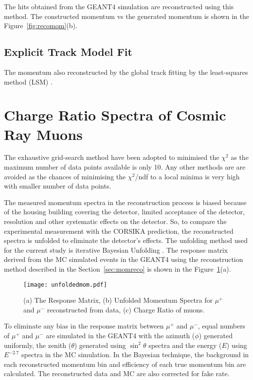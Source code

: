 The hits obtained from the GEANT4 simulation are reconstructed using
this method. The constructed momentum vs the generated momentum is
shown in the Figure~\ref{fig:recomom}(b).

\subsection{Explicit Track Model Fit}
The momentum also reconstructed by the global track fitting by the
least-squares method (LSM) \cite{explicit1}.


\section{Charge Ratio Spectra of Cosmic Ray Muons}
\label{section:multiresult}

The exhaustive grid-search method have been adopted to minimised the
$\chi^{2}$ as the maximum number of data points available is only 10.
Any other methods are are avoided as the chances of minimising the
$\chi^{2}$/ndf to a local minima is very high with smaller number of
data points.


The measured momentum spectra in the reconstruction process is biased
because of the housing building covering the detector, limited
acceptance of the detector, resolution and other systematic effects
on the detector. So, to compare the experimental measurement with the
CORSIKA prediction, the reconstructed spectra is unfolded to eliminate
the detector's effects.
The unfolding method used for the current study is iterative
Bayesian Unfolding \cite{bayesian}.
The response matrix derived from the MC simulated events in the
GEANT4 using the reconstruction method described in the
Section~\ref{sec:momreco} is shown in the
Figure~\ref{fig:unfolddata}(a).
\begin{figure}[h]
  \texttt{[image: unfoldedmom.pdf]}
  \caption{(a) The Response Matrix, (b) Unfolded Momentum Spectra for
    $\mu^{+}$ and $\mu^{-}$ reconstructed from data, (c) Charge Ratio
    of muons.}
  \label{fig:unfolddata}
\end{figure}
To eliminate any bias in the response matrix between $\mu^{+}$ and
$\mu^{-}$, equal numbers of $\mu^{+}$ and $\mu^{-}$ are simulated in
the GEANT4 with the azimuth ($\phi$) generated uniformly, the zenith
($\theta$) generated using $\sin^{2} \theta$ spectra and the energy
($E$) using $E^{-2.7}$ spectra in the MC simulation.
In the Bayesian technique, the background in each reconstructed
momentum bin and efficiency of each true momentum bin are calculated.
The reconstructed data and MC are also corrected for fake rate.

